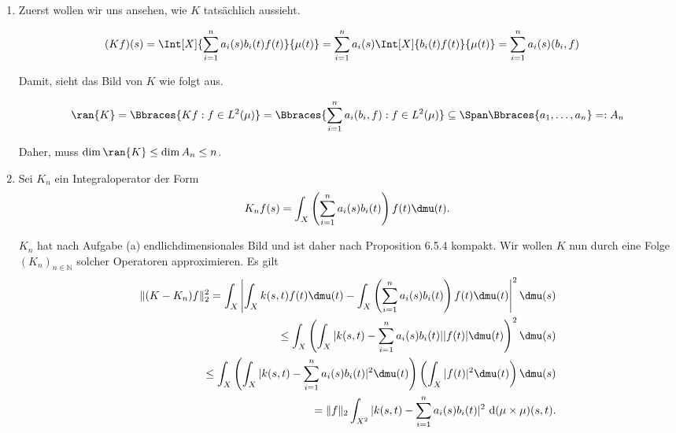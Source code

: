\begin{solution}

\phantom{}

\begin{enumerate}[label = (\alph*)]

  \item
  Zuerst wollen wir uns ansehen, wie $K$ tatsächlich aussieht.

  \begin{align*}
    (K f)(s)
    & =
    \Int[X]
    {
      \sum_{i=1}^n
      a_i(s) b_i(t) f(t)
    }{\mu(t)}
    =
    \sum_{i=1}^n
    a_i(s) \Int[X]{b_i(t) f(t)}{\mu(t)}
    =
    \sum_{i=1}^n
    a_i(s) (b_i, f)
  \end{align*}

  Damit, sieht das Bild von $K$ wie folgt aus.

  \begin{align*}
    \ran{K}
    =
    \Bbraces
    {
      K f:
      f \in L^2(\mu)
    }
    =
    \Bbraces
    {
      \sum_{i=1}^n
      a_i (b_i, f):
      f \in L^2(\mu)
    }
    \subseteq
    \Span \Bbraces{a_1, \ldots, a_n}
    =: A_n
  \end{align*}

  Daher, muss $\dim \ran{K} \leq \dim{A_n} \leq n$.

  \item
  Sei $K_n$ ein Integraloperator der Form
\begin{align}
    K_n f(s) = \int_X \left(\sum_{i=1}^n a_i(s) b_i(t)\right) f(t) \dmu(t).
\end{align}

$K_n$ hat nach Aufgabe (a) endlichdimensionales Bild und ist daher nach Proposition 6.5.4 kompakt. Wir wollen $K$ nun durch eine Folge $(K_n)_{n \in \mathbb{N}}$ solcher Operatoren approximieren. Es gilt
\begin{align}
    \|(K-K_n) f\|_2^2 = \int_X \left| \int_X k(s,t) f(t) \dmu(t) - \int_X \left(\sum_{i=1}^n a_i(s) b_i(t)\right) f(t) \dmu(t) \right|^2 \dmu(s) \\
    \leq \int_X \left( \int_X |k(s,t) - \sum_{i=1}^n a_i(s) b_i(t)| |f(t)| \dmu(t)\right)^2 \dmu(s) \\
    \leq \int_X \left(\int_X |k(s,t) - \sum_{i=1}^n a_i(s) b_i(t)|^2 \dmu(t)\right) \left(\int_X |f(t)|^2 \dmu(t)\right) \dmu(s) \\
    = \|f\|_2 \int_{X^2} |k(s,t) - \sum_{i=1}^n a_i(s) b_i(t)|^2 ~\mathrm{d}(\mu\times\mu)(s,t).
\end{align}


\end{enumerate}
\end{solution}
